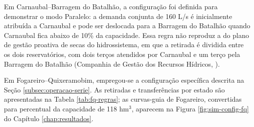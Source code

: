 \begin{table}[!htbp]
    \captionsetup{width=15cm}
    \caption{Curvas-guia adotadas na aplicação de Flor do Campo (\% da capacidade)}
    \label{tab:curvas-flor}
    \centering
    \scriptsize
\end{table}

Em Carnaubal--Barragem do Batalhão, a configuração foi definida para demonstrar o modo Paralelo: a demanda conjunta de 160 L/s é inicialmente atribuída a Carnaubal e pode ser deslocada para a Barragem do Batalhão quando Carnaubal fica abaixo de 10\% da capacidade. Essa regra não reproduz a do plano de gestão proativa de secas do hidrossistema, em que a retirada é dividida entre os dois reservatórios, com dois terços atendidos por Carnaubal e um terço pela Barragem do Batalhão (Companhia de Gestão dos Recursos Hídricos, \citeyear{pgpsCarnaubal2024}).

Em Fogareiro--Quixeramobim, empregou-se a configuração específica descrita na Seção \ref{subsec:operacao-serie}. As retiradas e transferências por estado são apresentadas na Tabela \ref{tab:fq-regras}; as curvas-guia de Fogareiro, convertidas para percentual da capacidade de 118 hm$^3$, aparecem na Figura \ref{fig:sim-config-fq} do Capítulo \ref{chap:resultados}.

